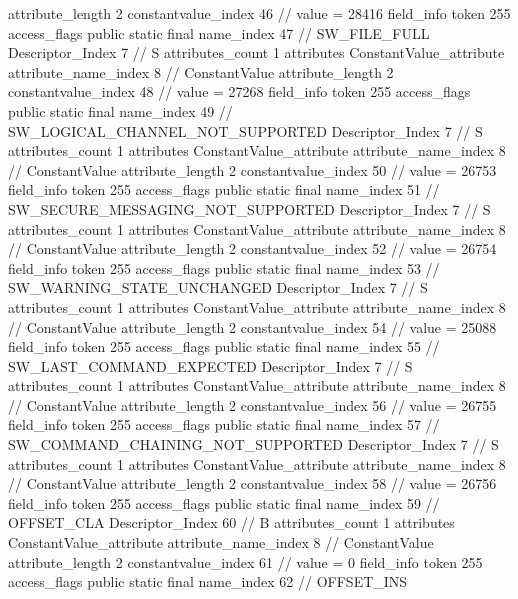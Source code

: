 {{{{{{{					attribute_length	2
					constantvalue_index	46		// value = 28416
				}
				}
			}
			field_info {
				token	255
				access_flags	public static final
				name_index	47		// SW_FILE_FULL
				Descriptor_Index	7		// S
				attributes_count	1
				attributes {
				ConstantValue_attribute {
					attribute_name_index	8		// ConstantValue
					attribute_length	2
					constantvalue_index	48		// value = 27268
				}
				}
			}
			field_info {
				token	255
				access_flags	public static final
				name_index	49		// SW_LOGICAL_CHANNEL_NOT_SUPPORTED
				Descriptor_Index	7		// S
				attributes_count	1
				attributes {
				ConstantValue_attribute {
					attribute_name_index	8		// ConstantValue
					attribute_length	2
					constantvalue_index	50		// value = 26753
				}
				}
			}
			field_info {
				token	255
				access_flags	public static final
				name_index	51		// SW_SECURE_MESSAGING_NOT_SUPPORTED
				Descriptor_Index	7		// S
				attributes_count	1
				attributes {
				ConstantValue_attribute {
					attribute_name_index	8		// ConstantValue
					attribute_length	2
					constantvalue_index	52		// value = 26754
				}
				}
			}
			field_info {
				token	255
				access_flags	public static final
				name_index	53		// SW_WARNING_STATE_UNCHANGED
				Descriptor_Index	7		// S
				attributes_count	1
				attributes {
				ConstantValue_attribute {
					attribute_name_index	8		// ConstantValue
					attribute_length	2
					constantvalue_index	54		// value = 25088
				}
				}
			}
			field_info {
				token	255
				access_flags	public static final
				name_index	55		// SW_LAST_COMMAND_EXPECTED
				Descriptor_Index	7		// S
				attributes_count	1
				attributes {
				ConstantValue_attribute {
					attribute_name_index	8		// ConstantValue
					attribute_length	2
					constantvalue_index	56		// value = 26755
				}
				}
			}
			field_info {
				token	255
				access_flags	public static final
				name_index	57		// SW_COMMAND_CHAINING_NOT_SUPPORTED
				Descriptor_Index	7		// S
				attributes_count	1
				attributes {
				ConstantValue_attribute {
					attribute_name_index	8		// ConstantValue
					attribute_length	2
					constantvalue_index	58		// value = 26756
				}
				}
			}
			field_info {
				token	255
				access_flags	public static final
				name_index	59		// OFFSET_CLA
				Descriptor_Index	60		// B
				attributes_count	1
				attributes {
				ConstantValue_attribute {
					attribute_name_index	8		// ConstantValue
					attribute_length	2
					constantvalue_index	61		// value = 0
				}
				}
			}
			field_info {
				token	255
				access_flags	public static final
				name_index	62		// OFFSET_INS
}}}}}
